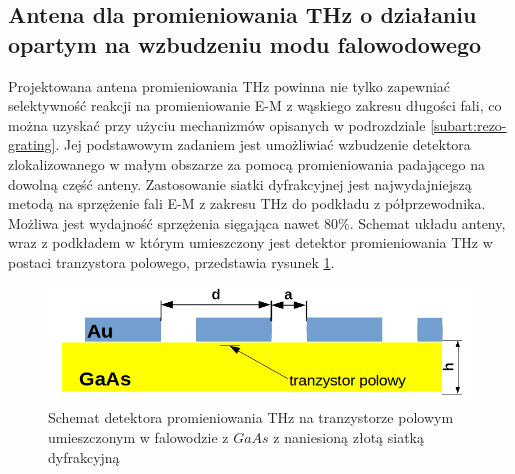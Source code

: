 \subsection{Antena dla promieniowania THz o działaniu opartym na wzbudzeniu modu falowodowego}
\label{subart:antenaThz}
Projektowana antena promieniowania THz powinna nie tylko zapewniać selektywność reakcji na promieniowanie E-M z wąskiego zakresu długości fali, co można uzyskać przy użyciu mechanizmów opisanych w podrozdziale \ref{subart:rezo-grating}. Jej podstawowym zadaniem jest umożliwiać wzbudzenie detektora zlokalizowanego w małym obszarze za pomocą promieniowania padającego na dowolną część anteny. Zastosowanie siatki dyfrakcyjnej jest najwydajniejszą metodą na sprzężenie fali E-M z zakresu THz do podkładu z półprzewodnika. Możliwa jest wydajność sprzężenia sięgająca nawet 80\%\cite{roux2002grating}.  Schemat układu anteny, wraz z podkładem w którym umieszczony jest detektor promieniowania THz w postaci tranzystora polowego, przedstawia rysunek \ref{fig:schem-podklad-falo}.
\begin{figure}[tb]
	\centering
	\includegraphics[width=\textwidth]{images/thz/schemat-podklad-falo.png}
	\caption{Schemat detektora promieniowania THz na tranzystorze polowym umieszczonym w falowodzie z $GaAs$ z naniesioną złotą siatką dyfrakcyjną}
	\label{fig:schem-podklad-falo}
\end{figure}

